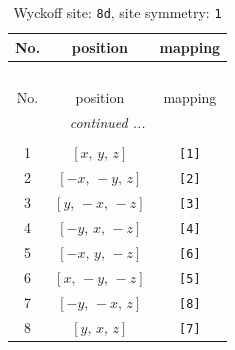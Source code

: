 \documentclass[fleqn,8pt]{jsarticle}
\begin{document}
\begin{longtable}{ccc}
\caption{Wyckoff site: {\tt 8d}, site symmetry: {\tt 1}}
 \\
 \hline \hline
No. & position & mapping \\ \hline \endfirsthead

\multicolumn{2}{l}{\tablename\ \thetable{}} \\
 \hline \hline
No. & position & mapping \\ \hline \endhead

 \hline \hline
\multicolumn{2}{r}{\footnotesize\it continued ...} \\ \endfoot

 \hline \hline
\multicolumn{2}{r}{} \\ \endlastfoot

1 & $\left[ x,\, y,\, z \right]$ & {\tt [1]} \\ \hline
2 & $\left[ - x,\, - y,\, z \right]$ & {\tt [2]} \\ \hline
3 & $\left[ y,\, - x,\, - z \right]$ & {\tt [3]} \\ \hline
4 & $\left[ - y,\, x,\, - z \right]$ & {\tt [4]} \\ \hline
5 & $\left[ - x,\, y,\, - z \right]$ & {\tt [6]} \\ \hline
6 & $\left[ x,\, - y,\, - z \right]$ & {\tt [5]} \\ \hline
7 & $\left[ - y,\, - x,\, z \right]$ & {\tt [8]} \\ \hline
8 & $\left[ y,\, x,\, z \right]$ & {\tt [7]} \\
\end{longtable}
\end{document}
